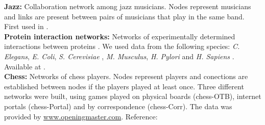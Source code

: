 \documentclass{article}
\begin{document}
\textbf{Jazz:} Collaboration network among jazz musicians. Nodes represent musicians and links are present between pairs of musicians that play in the same band. First used in \cite{Gleiser2003CommunityJazz}.
\\


\textbf{Protein interaction networks:} Networks of experimentally determined interactions between proteins \cite{Xenarios2000DIP:Proteins, Xenarios2002DIPInteractions}. We used data from the following species: \emph{C. Elegans}, \emph{E. Coli}, \emph{S. Cerevisiae} \cite{Colizza2006DetectingNetworks}, \emph{M. Musculus}, \emph{H. Pylori} and \emph{H. Sapiens} \cite{Goh2006SkeletonNetworks}. Available at \cite{DIP}.
\\

\textbf{Chess:} Networks of chess players. Nodes represent players and conections are established between nodes if the players played at least once. Three different networks were built, using games played on physical boards (chess-OTB), internet portals (chess-Portal) and by correspondence (chess-Corr). The data was provided by \url{www.openingmaster.com}. Reference: \cite{Almeira2017StructurePlayers}



\end{document}
